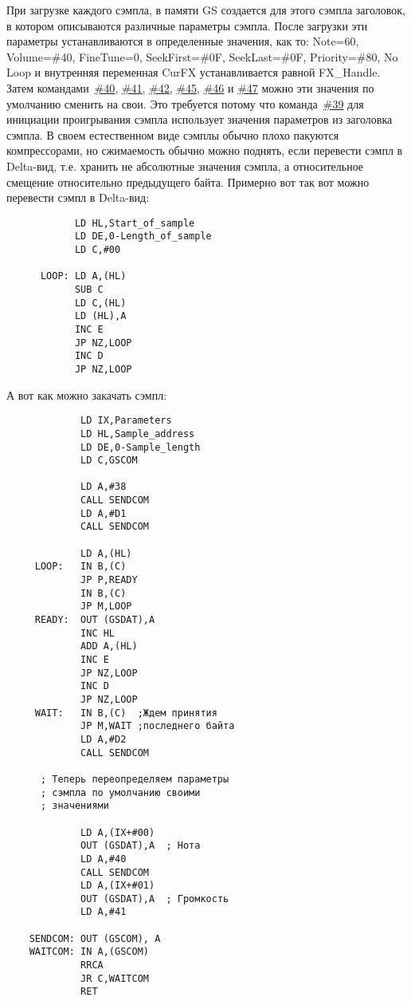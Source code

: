 \documentclass[a4paper,11pt]{article}
\begin{document}
При загрузке каждого сэмпла, в памяти GS создается для этого сэмпла заголовок, в котором описываются различные параметры сэмпла. После загрузки эти параметры устанавливаются в определенные значения, как то:  Note=60,    Volume=\#40,    FineTune=0,    SeekFirst=\#0F,    SeekLast=\#0F, Priority=\#80,  No Loop и внутренняя переменная CurFX устанавливается равной FX\_Handle.
Затем командами~\hyperref[cmd:40]{\#40}, \hyperref[cmd:41]{\#41}, \hyperref[cmd:42]{\#42}, \hyperref[cmd:45]{\#45},
\hyperref[cmd:46]{\#46} и \hyperref[cmd:47]{\#47} можно эти значения по умолчанию сменить на свои.
Это требуется потому что команда~\hyperref[cmd:39]{\#39} для инициации проигрывания сэмпла использует значения
параметров из заголовка сэмпла.
В своем естественном виде сэмплы обычно плохо пакуются компрессорами, но сжимаемость обычно можно поднять,
если перевести сэмпл в Delta-вид, т.е. хранить не абсолютные значения сэмпла, а относительное смещение
относительно предыдущего байта.  Примерно вот так вот можно перевести сэмпл в Delta-вид:
\begin{verbatim}
            LD HL,Start_of_sample
            LD DE,0-Length_of_sample
            LD C,#00

      LOOP: LD A,(HL)
            SUB C
            LD C,(HL)
            LD (HL),A
            INC E
            JP NZ,LOOP
            INC D
            JP NZ,LOOP
\end{verbatim}

А вот как можно закачать сэмпл:
\begin{verbatim}
             LD IX,Parameters
             LD HL,Sample_address
             LD DE,0-Sample_length
             LD C,GSCOM

             LD A,#38
             CALL SENDCOM
             LD A,#D1
             CALL SENDCOM

             LD A,(HL)
     LOOP:   IN B,(C)
             JP P,READY
             IN B,(C)
             JP M,LOOP
     READY:  OUT (GSDAT),A
             INC HL
             ADD A,(HL)
             INC E
             JP NZ,LOOP
             INC D
             JP NZ,LOOP
     WAIT:   IN B,(C)  ;Ждем принятия
             JP M,WAIT ;последнего байта
             LD A,#D2
             CALL SENDCOM

      ; Теперь переопределяем параметры
      ; сэмпла по умолчанию своими
      ; значениями

             LD A,(IX+#00)
             OUT (GSDAT),A  ; Нота
             LD A,#40
             CALL SENDCOM
             LD A,(IX+#01)
             OUT (GSDAT),A  ; Громкость
             LD A,#41

    SENDCOM: OUT (GSCOM), A
    WAITCOM: IN A,(GSCOM)
             RRCA
             JR C,WAITCOM
             RET
\end{verbatim}
\end{document}
